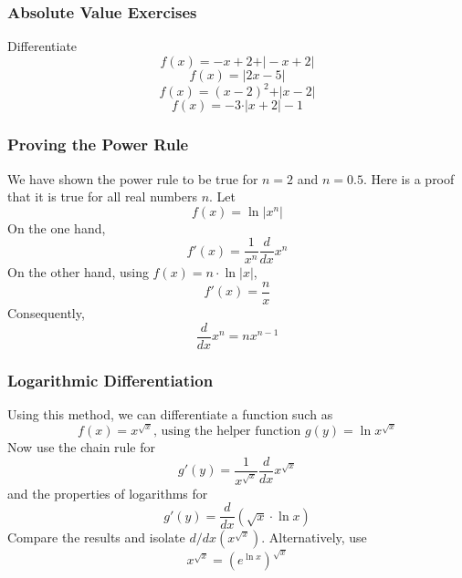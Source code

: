 \documentclass[xcolor=dvipsnames]{beamer}
\begin{document}
\begin{frame}
  \frametitle{Absolute Value Exercises}
Differentiate
\begin{equation}
  \label{eq:ikaishup}
  f(x)=-x+2+\vert{}-x+2\vert
\end{equation}
\begin{equation}
  \label{eq:emaiyito}
  f(x)=\vert{}2x-5\vert
\end{equation}
\begin{equation}
  \label{eq:deiquohr}
  f(x)=(x-2)^{2}+\vert{}x-2\vert
\end{equation}
\begin{equation}
  \label{eq:leihuwee}
  f(x)=-3\cdot\vert{}x+2\vert{}-1
\end{equation}
\end{frame}

\begin{frame}
  \frametitle{Proving the Power Rule}
We have shown the power rule to be true for $n=2$ and $n=0.5$. Here is
a proof that it is true for all real numbers $n$. Let
\begin{equation}
  \label{eq:taesaeph}
  f(x)=\ln\vert{}x^{n}\vert
\end{equation}
On the one hand,
\begin{equation}
  \label{eq:uzahheir}
  f'(x)=\frac{1}{x^{n}}\frac{d}{dx}x^{n}
\end{equation}
On the other hand, using $f(x)=n\cdot\ln\vert{}x\vert$,
\begin{equation}
  \label{eq:veikoowa}
f'(x)=\frac{n}{x}  
\end{equation}
Consequently,
\begin{equation}
  \label{eq:aebiedah}
  \frac{d}{dx}x^{n}=nx^{n-1}
\end{equation}
\end{frame}

\begin{frame}
  \frametitle{Logarithmic Differentiation}
Using this method, we can differentiate a function such as
\begin{equation}
  \label{eq:ooteiquo}
  f(x)=x^{\sqrt{x}}\mbox{, using the helper function }g(y)=\ln{}x^{\sqrt{x}}
\end{equation}
Now use the chain rule for
\begin{equation}
  \label{eq:quuquish}
  g'(y)=\frac{1}{x^{\sqrt{x}}}\frac{d}{dx}x^{\sqrt{x}}
\end{equation}
and the properties of logarithms for
\begin{equation}
  \label{eq:ahfahngi}
  g'(y)=\frac{d}{dx}\left(\sqrt{x}\cdot\ln{}x\right)
\end{equation}
Compare the results and isolate $d/dx(x^{\sqrt{x}})$. Alternatively,
use
\begin{equation}
  \label{eq:gaibahto}
  x^{\sqrt{x}}=\left(e^{\ln{}x}\right)^{\sqrt{x}}
\end{equation}
\end{frame}
\end{document}
